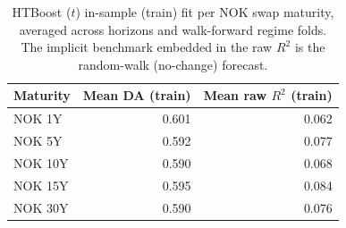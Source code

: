 \begin{table}[htbp]
\centering
\caption{HTBoost ($t$) in-sample (train) fit per NOK swap maturity, averaged across horizons and walk-forward regime folds. The implicit benchmark embedded in the raw $R^2$ is the random-walk (no-change) forecast.}
\label{tab:is_maturity}
\begin{tabular}{lrr}
\toprule
Maturity & Mean DA (train) & Mean raw $R^2$ (train) \\
\midrule
NOK 1Y & 0.601 & 0.062 \\
NOK 5Y & 0.592 & 0.077 \\
NOK 10Y & 0.590 & 0.068 \\
NOK 15Y & 0.595 & 0.084 \\
NOK 30Y & 0.590 & 0.076 \\
\bottomrule
\end{tabular}
\end{table}
